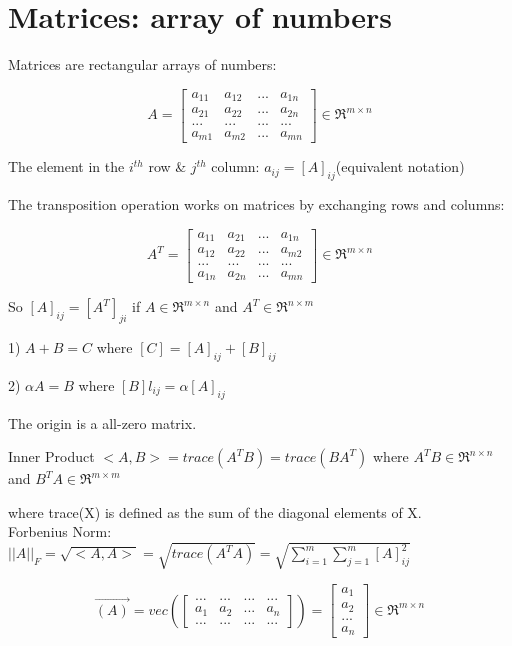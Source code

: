 \section{Matrices: array of numbers}



Matrices are rectangular arrays of numbers:

$$
A = 
\left[
\begin{matrix}
a_{11} & a_{12} & ... & a_{1n} \\
a_{21} & a_{22} & ... & a_{2n} \\
... & ... & ... & ...\\
a_{m1} & a_{m2} & ... & a_{mn}
\end{matrix}
\right] \in \Re^{m\times n}
$$


The element in the $i^{th}$ row \& $j^{th}$ column: $a_{ij} = [A]_{ij}$(equivalent notation)

The transposition operation works on matrices by exchanging rows and columns: 

$$
A^T = 
\left[
\begin{matrix}
a_{11} & a_{21} & ... & a_{1n} \\
a_{12} & a_{22} & ... & a_{m2} \\
... & ... & ... & ...\\
a_{1n} & a_{2n} & ... & a_{mn}
\end{matrix}
\right] \in \Re^{m\times n}
$$

So $[A]_{ij}  = [A^T]_{ji}$ if $A\in \Re^{m\times n}$ and $A^T\in \Re^{n\times m}$


1) $A + B = C$ where $[C] = [A]_{ij} + [B]_{ij}$

2) $\alpha A = B$ where $[B]l_{ij} = \alpha [A]_{ij}$

The origin is a all-zero matrix. 

\begin{definition}{Inner Product}
	$<A, B> = trace(A^TB) = trace(BA^T)$ where $A^TB\in \Re^{n\times n}$ and $B^TA\in \Re^{m\times m}$
\end{definition}

where trace(X) is defined as the sum of the diagonal elements of X. \\

Forbenius Norm: $||A||_F = \sqrt{<A, A>} = \sqrt{trace(A^TA)} = \sqrt{\sum^m_{i=1}\sum^m_{j=1}[A]^2_{ij}}$

$$\vec{(A)} = vec
\left(
\left[
\begin{matrix}
... & ... & ... & ... \\
a_{1} & a_{2} & ... & a_{n} \\
... & ... & ... & ...
\end{matrix}
\right]\right) = 
\left[
\begin{matrix}
a_{1} \\
a_{2} \\
... \\
a_{n}
\end{matrix}
\right]
\in \Re^{m\times n}
$$

